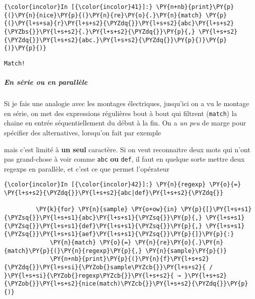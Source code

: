     \begin{Verbatim}[commandchars=\\\{\},frame=single,framerule=0.3mm,rulecolor=\color{cellframecolor}]
{\color{incolor}In [{\color{incolor}41}]:} \PY{n+nb}{print}\PY{p}{(}\PY{n}{nice}\PY{p}{(}\PY{n}{re}\PY{o}{.}\PY{n}{match} \PY{p}{(}\PY{l+s+sa}{r}\PY{l+s+s2}{\PYZdq{}}\PY{l+s+s2}{abc}\PY{l+s+s2}{\PYZbs{}}\PY{l+s+s2}{.}\PY{l+s+s2}{\PYZdq{}}\PY{p}{,} \PY{l+s+s2}{\PYZdq{}}\PY{l+s+s2}{abc.}\PY{l+s+s2}{\PYZdq{}}\PY{p}{)}\PY{p}{)}\PY{p}{)}
\end{Verbatim}


    \begin{Verbatim}[commandchars=\\\{\},frame=single,framerule=0.3mm,rulecolor=\color{cellframecolor}]
Match!
\end{Verbatim}

    \hypertarget{en-suxe9rie-ou-en-paralluxe8le}{%
\subparagraph{En série ou en
parallèle}\label{en-suxe9rie-ou-en-paralluxe8le}}

    Si je fais une analogie avec les montages électriques, jusqu'ici on a vu
le montage en série, on met des expressions régulières bout à bout qui
filtrent (\texttt{match}) la chaine en entrée séquentiellement du début
à la fin. On a \emph{un peu} de marge pour spécifier des alternatives,
lorsqu'on fait par exemple

\begin{Shaded}
\begin{Highlighting}[frame=lines,framerule=0.6mm,rulecolor=\color{asisframecolor}]
\end{Highlighting}
\end{Shaded}

mais c'est limité à \textbf{un seul} caractère. Si on veut reconnaitre
deux mots qui n'ont pas grand-chose à voir comme \texttt{abc}
\textbf{ou} \texttt{def}, il faut en quelque sorte mettre deux regexps
en parallèle, et c'est ce que permet l'opérateur \texttt{\textbar{}}

    \begin{Verbatim}[commandchars=\\\{\},frame=single,framerule=0.3mm,rulecolor=\color{cellframecolor}]
{\color{incolor}In [{\color{incolor}42}]:} \PY{n}{regexp} \PY{o}{=} \PY{l+s+s2}{\PYZdq{}}\PY{l+s+s2}{abc|def}\PY{l+s+s2}{\PYZdq{}}
         
         \PY{k}{for} \PY{n}{sample} \PY{o+ow}{in} \PY{p}{[}\PY{l+s+s1}{\PYZsq{}}\PY{l+s+s1}{abc}\PY{l+s+s1}{\PYZsq{}}\PY{p}{,} \PY{l+s+s1}{\PYZsq{}}\PY{l+s+s1}{def}\PY{l+s+s1}{\PYZsq{}}\PY{p}{,} \PY{l+s+s1}{\PYZsq{}}\PY{l+s+s1}{aef}\PY{l+s+s1}{\PYZsq{}}\PY{p}{]}\PY{p}{:}
             \PY{n}{match} \PY{o}{=} \PY{n}{re}\PY{o}{.}\PY{n}{match}\PY{p}{(}\PY{n}{regexp}\PY{p}{,} \PY{n}{sample}\PY{p}{)}
             \PY{n+nb}{print}\PY{p}{(}\PY{n}{f}\PY{l+s+s2}{\PYZdq{}}\PY{l+s+si}{\PYZob{}sample\PYZcb{}}\PY{l+s+s2}{ / }\PY{l+s+si}{\PYZob{}regexp\PYZcb{}}\PY{l+s+s2}{ → }\PY{l+s+s2}{\PYZob{}}\PY{l+s+s2}{nice(match)\PYZcb{}}\PY{l+s+s2}{\PYZdq{}}\PY{p}{)}
\end{Verbatim}


